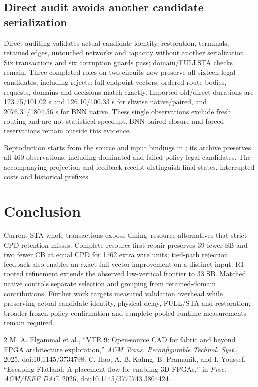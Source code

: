 \documentclass[conference,10pt]{IEEEtran}
\begin{document}
\subsection{Direct audit avoids another candidate serialization}
Direct auditing validates actual candidate identity, restoration, terminals, retained edges, untouched networks and capacity without another serialization. Six transactions and six corruption guards pass; domain/FULLSTA checks remain. Three completed roles on two circuits now preserve all sixteen legal candidates, including rejects: full endpoint vectors, ordered route bodies, requests, domains and decisions match exactly. Imported old/direct durations are 123.75/101.02 s and 126.10/100.33 s for eltwise native/paired, and 2076.31/1804.56 s for BNN native. These single observations exclude fresh routing and are not statistical speedups. BNN paired closure and forced reservations remain outside this evidence.

Reproduction starts from the source and input bindings in ; its archive preserves all 460 observations, including dominated and failed-policy legal candidates. The accompanying projection and feedback receipt distinguish final states, interrupted costs and historical prefixes.

\section{Conclusion}
Current-STA whole transactions expose timing--resource alternatives that strict CPD retention misses. Complete resource-first repair preserves 39 fewer SB and two fewer CB at equal CPD for 1762 extra wire units; tied-path rejection feedback also enables an exact full-vector improvement on a distinct input. R1-rooted refinement extends the observed low-vertical frontier to 33 SB. Matched native controls separate selection and grouping from retained-domain contributions. Further work targets measured validation overhead while preserving actual candidate identity, physical delay, FULL/STA and restoration; broader frozen-policy confirmation and complete pooled-runtime measurements remain required.

\begin{thebibliography}{2}
 M. A. Elgammal et al., ``VTR 9: Open-source CAD for fabric and beyond FPGA architecture exploration,'' \emph{ACM Trans. Reconfigurable Technol. Syst.}, 2025, doi:10.1145/3734798.
 C. Hao, A. B. Kahng, B. Pramanik, and I. Youssef, ``Escaping Flatland: A placement flow for enabling 3D FPGAs,'' in \emph{Proc. ACM/IEEE DAC}, 2026, doi:10.1145/3770743.3804424.
\end{thebibliography}
\end{document}

